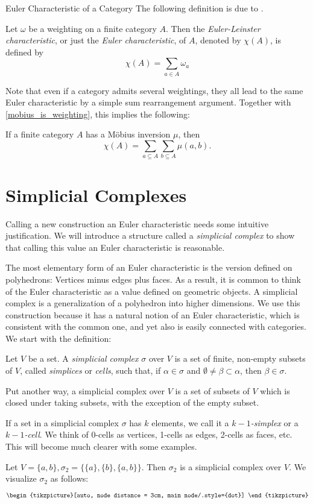 \documentclass[12pt]{pom_thesis}
\begin{document}
\begin{chapter}{Euler Characteristic of a Category}
The following definition is due to \cite{Lein1}.
\begin{defn}\label{cat_euler}
Let $\omega$ be a weighting on a finite category $A$. Then the \emph{Euler-Leinster characteristic}, or just the \emph{Euler characteristic}, of $A$, denoted by $\chi(A)$, is defined by
\[
\chi(A) = \sum_{a \in A} \omega_a
\]
\end{defn}
Note that even if a category admits several weightings, they all lead to the same Euler characteristic by a simple sum rearrangement argument. Together with \ref{mobius_is_weighting}, this implies the following:
\begin{cor}\label{euler_mu}
If a finite category $A$ has a M\"obius inversion $\mu$, then
\[\chi(A) = \sum_{a \subseteq A} \sum_{b \subseteq A} \mu(a, b).
\]
\end{cor}

\section{Simplicial Complexes}
Calling a new construction an Euler characteristic needs some intuitive justification. We will introduce a structure called a \textit{simplicial complex} to show that calling this value an Euler characteristic is reasonable. 

The most elementary form of an Euler characteristic is the version defined on polyhedrons: Vertices minus edges plus faces. As a result, it is common to think of the Euler characteristic as a value defined on geometric objects. A simplicial complex is a generalization of a polyhedron into higher dimensions. We use this construction because it has a natural notion of an Euler characteristic, which is consistent with the common one, and yet also is easily connected with categories. We start with the definition:

\begin{defn}
Let $V$ be a set. A \emph{simplicial complex} $\sigma$ over $V$ is a set of finite, non-empty subsets of $V$, called \emph{simplices} or \emph{cells}, such that, if $\alpha \in \sigma$ and $\emptyset \neq \beta \subset \alpha$, then $\beta \in \sigma$.
\end{defn}

Put another way, a simplicial complex over $V$  is a set of subsets of $V$ which is closed under taking subsets, with the exception of the empty subset. 

If a set in a simplicial complex $\sigma$ has $k$ elements, we call it a \emph{$k-1$-simplex} or a \emph{$k-1$-cell}. We think of 0-cells as vertices, 1-cells as edges, 2-cells as faces, etc. This will become much clearer with some examples.
\begin{examp}
Let $V=\{a,b\}, \sigma_2 = \{\{a\},\{b\}, \{a,b\}\}$. Then $\sigma_2$ is a simplicial complex over $V$. We visualize $\sigma_2$ as follows:
\[
\begin{tikzpicture}[auto, node distance = 3cm, main node/.style={dot}]


\end{tikzpicture}\]
\end{examp}
\end{chapter}
\end{document}
